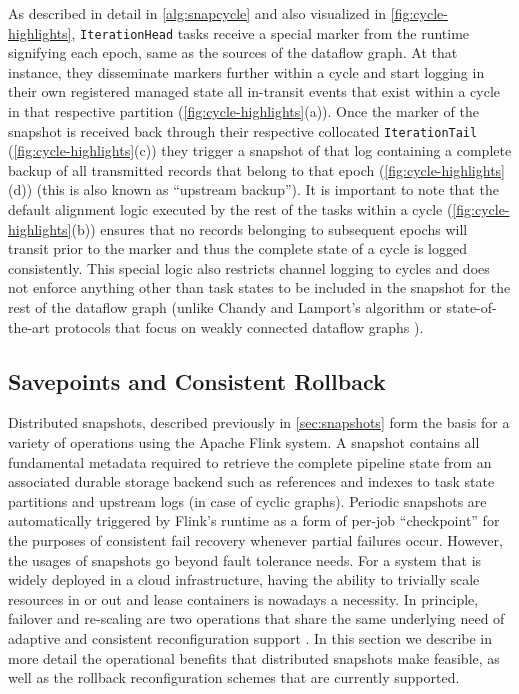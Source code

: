 As described in detail in \autoref{alg:snapcycle} and also visualized in \autoref{fig:cycle-highlights}, \texttt{IterationHead} tasks receive a special marker from the runtime signifying each epoch, same as the sources of the dataflow graph. At that instance, they disseminate markers further within a cycle and start logging in their own registered managed state all in-transit events that exist within a cycle in that respective partition (\autoref{fig:cycle-highlights}(a)). Once the marker of the snapshot is received back through their respective collocated \texttt{IterationTail} (\autoref{fig:cycle-highlights}(c)) they trigger a snapshot of that log containing a complete backup of all transmitted records that belong to that epoch (\autoref{fig:cycle-highlights}(d)) (this is also known as ``upstream backup''). It is important to note that the default alignment logic executed by the rest of the tasks within a cycle (\autoref{fig:cycle-highlights}(b)) ensures that no records belonging to subsequent epochs will transit prior to the marker and thus the complete state of a cycle is logged consistently. This special logic also restricts channel logging to cycles and does not enforce anything other than task states to be included in the snapshot for the rest of the dataflow graph (unlike Chandy and Lamport's \cite{chandy1985distributed} algorithm or state-of-the-art protocols that focus on weakly connected dataflow graphs \cite{elnozahy2002survey,jacques2016consistent,murray2013naiad}).


\subsection{Savepoints and Consistent Rollback}

Distributed snapshots, described previously in \autoref{sec:snapshots} form the basis for a variety of operations using the Apache Flink system. A snapshot contains all fundamental metadata required to retrieve the complete pipeline state from an associated durable storage backend such as references and indexes to task state partitions and upstream logs (in case of cyclic graphs). Periodic snapshots are automatically triggered by Flink's runtime as a form of per-job ``checkpoint'' for the purposes of consistent fail recovery whenever partial failures occur. However, the usages of snapshots go beyond fault tolerance needs. For a system that is widely deployed in a cloud infrastructure, having the ability to trivially scale resources in or out and lease containers is nowadays a necessity. In principle, failover and re-scaling are two operations that share the same underlying need of adaptive and consistent reconfiguration support \cite{castro2013integrating}. In this section we describe in more detail the operational benefits that distributed snapshots make feasible, as well as the rollback reconfiguration schemes that are currently supported.

